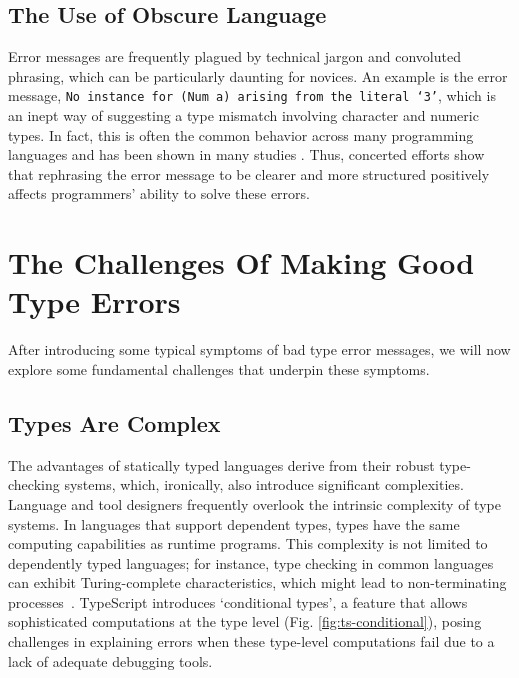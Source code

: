 \subsection{The Use of Obscure Language}

Error messages are frequently plagued by technical jargon and convoluted phrasing, which can be particularly daunting for novices. An example is the error message, \texttt{No instance for (Num a) arising from the literal `3'}, which is an inept way of suggesting a type mismatch involving character and numeric types. In fact, this is often the common behavior across many programming languages and has been shown in many studies \cite{Barik2017-gy, Tirronen2015-nr, Prather2017-dg}. Thus, concerted efforts \cite{Becker2016-kc, Barik2014-ib}  show that rephrasing the error message to be clearer and more structured positively affects programmers' ability to solve these errors.


\section{The Challenges Of Making Good Type Errors}

After introducing some typical symptoms of bad type error messages, we will now explore some fundamental challenges that underpin these symptoms.

\subsection{Types Are Complex}

The advantages of statically typed languages derive from their robust type-checking systems, which, ironically, also introduce significant complexities. Language and tool designers frequently overlook the intrinsic complexity of type systems. In languages that support dependent types, types have the same computing capabilities as runtime programs. This complexity is not limited to dependently typed languages; for instance, type checking in common languages can exhibit Turing-complete characteristics, which might lead to non-terminating processes~\cite{Wells1999-ob}. TypeScript introduces `conditional types', a feature that allows sophisticated computations at the type level (Fig. \ref{fig:ts-conditional}), posing challenges in explaining errors when these type-level computations fail due to a lack of adequate debugging tools.



